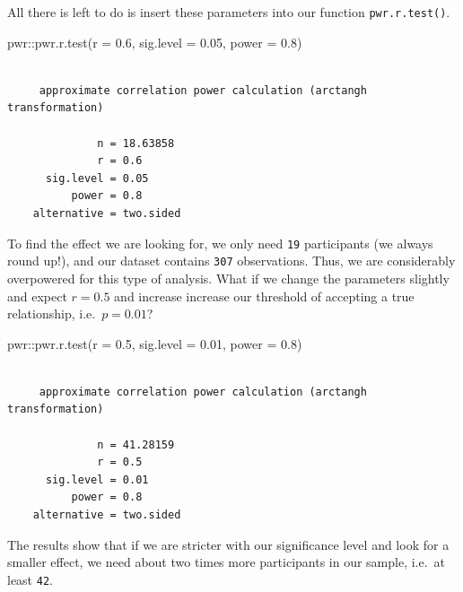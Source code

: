 \documentclass[
  letterpaper,
]{krantz}
\makeatletter
\newenvironment{Shaded}{\begin{snugshade}}{\end{snugshade}}
\newcommand{\AttributeTok}[1]{\textcolor[rgb]{0.40,0.45,0.13}{#1}}
\newcommand{\FloatTok}[1]{\textcolor[rgb]{0.68,0.00,0.00}{#1}}
\newcommand{\FunctionTok}[1]{\textcolor[rgb]{0.28,0.35,0.67}{#1}}
\newcommand{\NormalTok}[1]{\textcolor[rgb]{0.00,0.23,0.31}{#1}}
\newcommand{\SpecialCharTok}[1]{\textcolor[rgb]{0.37,0.37,0.37}{#1}}
\newenvironment{kframe}{%
\medskip{}
\setlength{\fboxsep}{.8em}
 \def\at@end@of@kframe{}%
 \ifinner\ifhmode%
  \def\at@end@of@kframe{\end{minipage}}%
  \begin{minipage}{\columnwidth}%
 \fi\fi%
 \def\FrameCommand##1{\hskip\@totalleftmargin \hskip-\fboxsep
 \colorbox{shadecolor}{##1}\hskip-\fboxsep
     \hskip-\linewidth \hskip-\@totalleftmargin \hskip\columnwidth}%
 \MakeFramed {\advance\hsize-\width
   \@totalleftmargin\z@ \linewidth\hsize
   \@setminipage}}%
 {\par\unskip\endMakeFramed%
 \at@end@of@kframe}
\renewenvironment{Shaded}{\begin{kframe}}{\end{kframe}}
\makeatother
\begin{document}
All there is left to do is insert these parameters into our function
\texttt{pwr.r.test()}.

\begin{Shaded}
\begin{Highlighting}[]
\NormalTok{pwr}\SpecialCharTok{::}\FunctionTok{pwr.r.test}\NormalTok{(}\AttributeTok{r =} \FloatTok{0.6}\NormalTok{,}
                \AttributeTok{sig.level =} \FloatTok{0.05}\NormalTok{,}
                \AttributeTok{power =} \FloatTok{0.8}\NormalTok{)}
\end{Highlighting}
\end{Shaded}

\begin{verbatim}

     approximate correlation power calculation (arctangh transformation) 

              n = 18.63858
              r = 0.6
      sig.level = 0.05
          power = 0.8
    alternative = two.sided
\end{verbatim}

To find the effect we are looking for, we only need \texttt{19}
participants (we always round up!), and our dataset contains
\texttt{307} observations. Thus, we are considerably overpowered for
this type of analysis. What if we change the parameters slightly and
expect \(r = 0.5\) and increase increase our threshold of accepting a
true relationship, i.e.~\(p = 0.01\)?

\begin{Shaded}
\begin{Highlighting}[]
\NormalTok{pwr}\SpecialCharTok{::}\FunctionTok{pwr.r.test}\NormalTok{(}\AttributeTok{r =} \FloatTok{0.5}\NormalTok{,}
                \AttributeTok{sig.level =} \FloatTok{0.01}\NormalTok{,}
                \AttributeTok{power =} \FloatTok{0.8}\NormalTok{)}
\end{Highlighting}
\end{Shaded}

\begin{verbatim}

     approximate correlation power calculation (arctangh transformation) 

              n = 41.28159
              r = 0.5
      sig.level = 0.01
          power = 0.8
    alternative = two.sided
\end{verbatim}

The results show that if we are stricter with our significance level and
look for a smaller effect, we need about two times more participants in
our sample, i.e.~at least \texttt{42}.
\end{document}
